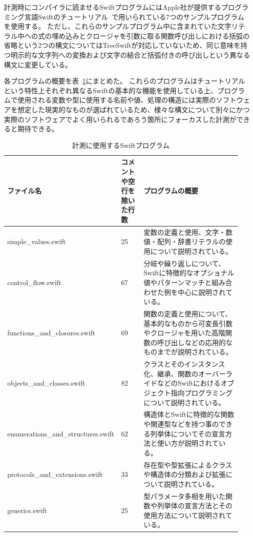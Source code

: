 計測時にコンパイラに読ませるSwiftプログラムにはApple社が提供するプログラミング言語Swiftのチュートリアル~\cite{swift-tour}で用いられている7つのサンプルプログラムを使用する。
ただし、これらのサンプルプログラム中に含まれていた文字リテラル中への式の埋め込みとクロージャを引数に取る関数呼び出しにおける括弧の省略という2つの構文についてはTreeSwiftが対応していないため、同じ意味を持つ明示的な文字列への変換および文字の結合と括弧付きの呼び出しという異なる構文に変更している。

各プログラムの概要を表~\ref{table:measure-sample-programs}にまとめた。
これらのプログラムはチュートリアルという特性上それぞれ異なるSwiftの基本的な機能を使用している上、プログラムで使用される変数や型に使用する名前や値、処理の構造には実際のソフトウェアを想定した現実的なものが選ばれているため、様々な構文について別々にかつ実際のソフトウェアでよく用いられるであろう箇所にフォーカスした計測ができると期待できる。

\begin{table}[!hbtp]
    \begin{center}
        \caption{計測に使用するSwiftプログラム}
        \begin{tabular}{|p{0.4\linewidth}|p{0.1\linewidth}|p{0.45\linewidth}|}
            \hline
            ファイル名 & コメントや空行を除いた行数 & プログラムの概要\\
            \hline
            \hline
            simple\_values.swift & 25 & 変数の定義と使用、文字・数値・配列・辞書リテラルの使用について説明されている。\\
            \hline
            control\_flow.swift & 67 & 分岐や繰り返しについて、Swiftに特徴的なオプショナル値やパターンマッチと組み合わせた例を中心に説明されている。\\
            \hline
            functions\_and\_closures.swift & 69 & 関数の定義と使用について、基本的なものから可変長引数やクロージャを用いた高階関数の呼び出しなどの応用的なものまでが説明されている。\\
            \hline
            objects\_and\_classes.swift & 82 & クラスとそのインスタンス化、継承、関数のオーバーライドなどのSwiftにおけるオブジェクト指向プログラミングについて説明されている。\\
            \hline
            enumerations\_and\_structures.swift & 62 & 構造体とSwiftに特徴的な関数や関連型などを持つ事のできる列挙体についてその宣言方法と使い方が説明されている。\\
            \hline
            protocols\_and\_extensions.swift & 33 & 存在型や型拡張によるクラスや構造体の分類および拡張について説明されている。\\
            \hline
            generics.swift & 25 & 型パラメータ多相を用いた関数や列挙体の宣言方法とその使用方法について説明されている。\\
            \hline
        \end{tabular}
        \label{table:measure-sample-programs}
    \end{center}
\end{table}

